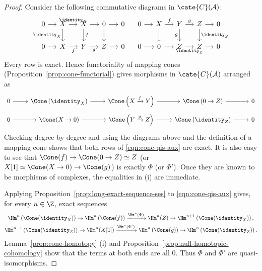 \begin{proof}
	Consider the following commutative diagrams in $\cate{C}(\mathcal{A})$:
	\[\begin{tikzcd}[column sep=small]
		0 \arrow[r] & X \arrow[r, "\identity_X"] \arrow[d, "{\identity_X}"'] & X \arrow[r] \arrow[d, "f"] & 0 \arrow[r] \arrow[d] & 0 \\
		0 \arrow[r] & X \arrow[r, "f"'] & Y \arrow[r, "g"'] & Z \arrow[r] & 0
	\end{tikzcd} \quad \begin{tikzcd}[column sep=small]
		0 \arrow[r] & X \arrow[d] \arrow[r, "f"] & Y \arrow[d, "g"'] \arrow[r, "g"] & Z \arrow[d, "\identity_Z"] \arrow[r] & 0 \\
		0 \arrow[r] & 0 \arrow[r] & Z \arrow[r, "\identity_Z"'] & Z \arrow[r] & 0
	\end{tikzcd}\]
	Every row is exact. Hence functoriality of mapping cones
	(Proposition~\ref{prop:cone-functorial}) gives morphisms in
	$\cate{C}(\mathcal{A})$ arranged as
	\begin{equation}\label{eqn:cone-qis-aux}\begin{tikzcd}[row sep=tiny]
		0 \arrow[r] & \Cone\left( \identity_X \right) \arrow[r] & \Cone\left( X \xrightarrow{f} Y \right) \arrow[r] & \Cone\left( 0 \to Z \right) \arrow[r] & 0 \\
		0 \arrow[r] & \Cone(X \to 0) \arrow[r] & \Cone\left( Y \xrightarrow{g} Z \right) \arrow[r] & \Cone\left( \identity_Z \right) \arrow[r] & 0
	\end{tikzcd}\end{equation}
	Checking degree by degree and using the diagrams above and the definition
	of a mapping cone shows that both rows of \eqref{eqn:cone-qis-aux} are
	exact. It is also easy to see that
	$\Cone(f)\to\Cone(0\to Z)\simeq Z$ (or
	$X[1]\simeq\Cone(X\to0)\to\Cone(g)$) is exactly $\Phi$ (or $\Phi'$).
	Once they are known to be morphisms of complexes, the equalities in (i)
	are immediate.

	Applying Proposition~\ref{prop:long-exact-sequence-ses} to
	\eqref{eqn:cone-qis-aux} gives, for every $n\in\Z$, exact sequences
	\begin{gather*}
		\Hm^n\left( \Cone(\identity_X) \right) \to \Hm^n \left( \Cone(f) \right) \xrightarrow{\Hm^n(\Phi)} \Hm^n(Z) \to \Hm^{n+1} \left( \Cone(\identity_X) \right), \\
		\Hm^{n-1}\left( \Cone(\identity_Z) \right) \to \Hm^n(X[1]) \xrightarrow{\Hm^n(\Phi')} \Hm^n\left( \Cone(g) \right) \to \Hm^n\left( \Cone(\identity_Z) \right).
	\end{gather*}
	Lemma~\ref{prop:cone-homotopy} (i) and
	Proposition~\ref{prop:null-homotopic-cohomology} show that the terms at
	both ends are all $0$. Thus $\Phi$ and $\Phi'$ are quasi-isomorphisms.


\end{proof}
